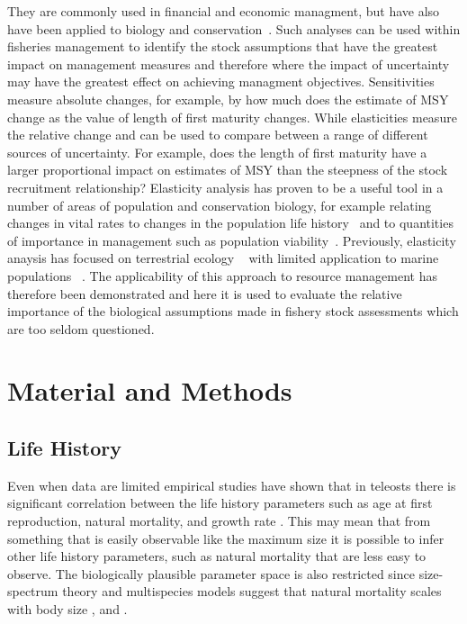 \documentclass[preprint,authoryear,12pt]{elsarticle}
\begin{document}
They are commonly used in financial and economic managment, but have also have been applied to biology and conservation~\cite{de1986elasticity}.
Such analyses can be used within fisheries management to identify the stock assumptions that have the greatest impact on management measures
and therefore where the impact of uncertainty may have the greatest effect on achieving managment objectives.
Sensitivities measure absolute changes, for example, by how much does the estimate of MSY change as the value of length of first maturity changes.
While elasticities measure the relative change and can be used to compare between a range of different sources of uncertainty. For example, 
does the length of first maturity have a larger proportional impact on estimates of MSY than the steepness of the stock recruitment relationship?
Elasticity analysis has  proven to be a useful tool in a number of areas of population and conservation biology, for example relating changes in
vital rates to changes in the population life history~\cite{grant2003density} and to quantities of importance in management such as population
viability~\cite{heppell1998application}. Previously, elasticity anaysis has focused on terrestrial 
ecology ~\cite{Benton1999467, Hunter2000299, Pichancourt200631} with limited application to marine populations ~\cite{RogersBennett2006, Heppell2007}. 
The applicability of this approach to resource management has therefore been demonstrated and here it is used to evaluate the relative importance of
the biological assumptions made in fishery stock assessments which are too seldom questioned.


\section{Material and Methods}
\label{Methods}

\subsection{Life History}
Even when data are limited empirical studies have shown that in teleosts there is significant correlation between the life history parameters  
such as age at first  reproduction, natural mortality, and growth rate \citet{roff1984evolution}. This may mean that from something that  
is easily observable like the maximum size it is possible to infer other life history parameters, such as natural mortality that are less easy to observe.  
The biologically plausible parameter space is also restricted since size-spectrum theory and multispecies models  
suggest that natural mortality scales with body size \citet{andersen2006asymptotic}, \citet{pope2006modelling} and \citet{gislason2008coexistence}.  
\end{document}
